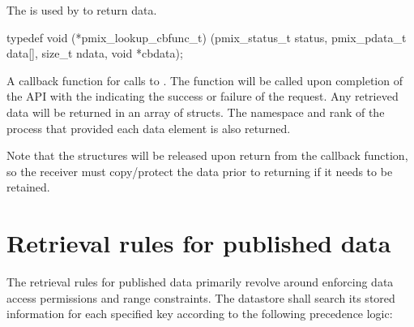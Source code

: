 \summary

The  is used by  to return data.

\cspecificstart
\begin{codepar}
typedef void (*pmix_lookup_cbfunc_t)
    (pmix_status_t status,
     pmix_pdata_t data[], size_t ndata,
     void *cbdata);
\end{codepar}
\cspecificend

\begin{arglist}
\end{arglist}


\descr

A callback function for calls to .
The function will be called upon completion of the  \ac{API} with the  indicating the success or failure of the request.
Any retrieved data will be returned in an array of  structs.
The namespace and rank of the process that provided each data element is also returned.

Note that the  structures will be released upon return from the callback function, so the receiver must copy/protect the data prior to returning if it needs to be retained.


\section{Retrieval rules for published data}
\label{chap:pub:retrules}

The retrieval rules for published data primarily revolve around enforcing data access permissions and range constraints. The datastore shall search its stored information for each specified key according to the following precedence logic:

